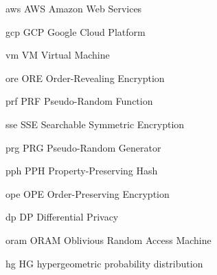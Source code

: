 
\newacronym%
	{aws}
	{AWS}
	{Amazon Web Services}

\newacronym%
	{gcp}
	{GCP}
	{Google Cloud Platform}

\newacronym%
	{vm}
	{VM}
	{Virtual Machine}

\newacronym%
	{ore}
	{ORE}
	{Order-Revealing Encryption}

\newacronym%
	{prf}
	{PRF}
	{Pseudo-Random Function}

\newacronym%
	{sse}
	{SSE}
	{Searchable Symmetric Encryption}

\newacronym%
	{prg}
	{PRG}
	{Pseudo-Random Generator}

\newacronym%
	{pph}
	{PPH}
	{Property-Preserving Hash}

\newacronym%
	{ope}
	{OPE}
	{Order-Preserving Encryption}

\newacronym%
	{dp}
	{DP}
	{Differential Privacy}

\newacronym%
	{oram}
	{ORAM}
	{Oblivious Random Access Machine}

\newacronym%
	{hg}
	{HG}
	{hypergeometric probability distribution}

